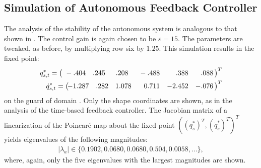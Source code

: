 \subsection{Simulation of Autonomous Feedback Controller} \noindent
The analysis of the stability of the autonomous system is analogous to that shown in . The control gain is again chosen to be $\varepsilon = 15$. The parameters are tweaked, as before, by multiplying row six by $1.25$. This simulation results in the fixed point:
\begin{align}
  q_{s,t}^{*} =
  \left(\!\!\!\!\begin{array}{r r r r r r}
    \hphantom{1}-.404 & .245 & \hphantom{1}.208 & \hphantom{0}-.488 & \hphantom{-0}.388 & \hphantom{-}.088
  \end{array}\!\!\right)^T\\
  {\dot q}_{s,t}^{*} =
  \left(\!\!\!\!\begin{array}{r r r r r r}
    -1.287 & .282 & 1.078 & \hphantom{-}0.711 & -2.452 & -.076
  \end{array}\!\!\right)^T
\end{align}
on the guard of domain {\DC}. Only the shape coordinates are shown, as in the analysis of the time-based feedback controller. The Jacobian matrix of a linearization of the Poincar{\'e} map about the fixed point $((q^*_s)^T, ({\dot q}^*_s)^T)^T$ yields eigenvalues of the following magnitudes:\
\begin{align}
  |\lambda_a| \in \{0.1902, 0.0680, 0.0680, 0.504, 0.0058, \ldots\},
\end{align}
where, again, only the five eigenvalues with the largest magnitudes are shown.
